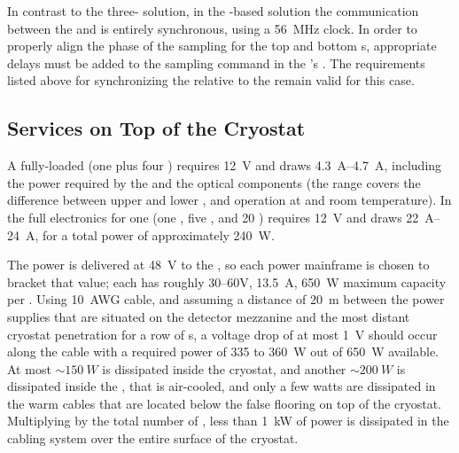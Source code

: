 In contrast to the three- solution, 
in the -based  solution 
the communication between the  and 
 is entirely synchronous, using a \SI{56}{MHz} 
clock. In order to properly align the phase of the
 sampling for the top and bottom s,
appropriate delays must be added to the sampling
command in the 's . 
The requirements listed above for synchronizing 
the  relative to the  remain
valid for this case. 

\subsection{Services on Top of the Cryostat}
\label{sec:fdsp-tpcelec-design-services}

A fully-loaded  (one  plus four ) 
requires \SI{12}{V} and draws \SIrange{4.3}{4.7}{A}, including the
power required by the  and the optical components (the range 
covers the difference between upper and lower , and operation
at \lntwo and room temperature). In 
 the full electronics for one  (one , 
five , and \num{20} ) requires \SI{12}{V} and 
draws \SIrange{22}{24}{A}, for a total power of approximately 
\SI{240}{W}. 

The  power is delivered at \SI{48}{V} to the , 
so each  power mainframe is chosen to bracket that value; 
each has roughly \numrange{30}{60}{V}, \SI{13.5}{A}, \SI{650}{W} 
maximum capacity per . Using \SI{10}{AWG} cable, and assuming
a distance of \SI{20}{m} between the  power supplies 
that are situated on the detector mezzanine and the most distant
cryostat penetration for a row of s, a voltage
drop of at most \SI{1}{V} should occur along the cable with a required power of 
\num{335} to \SI{360}{W} out of \SI{650}{W} available.
At most $\sim\SI{150}{W}$ is dissipated inside the cryostat, and another
$\sim\SI{200}{W}$ is dissipated inside the , that is
air-cooled, and only a few watts are dissipated in the warm cables
that are located below the false flooring on top of the cryostat.
Multiplying by the total number of , less 
than \SI{1}{kW} of power is dissipated in the cabling system 
over the entire surface of the cryostat. 

